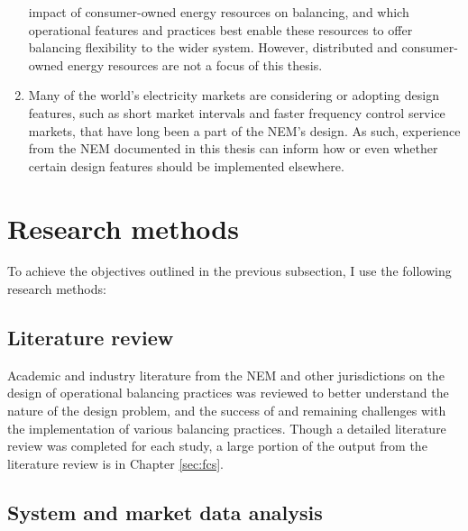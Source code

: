 \documentclass[12pt,a4paper,]{report}
\begin{document}
\begin{enumerate}
  impact of consumer-owned energy resources on balancing, and which
  operational features and practices best enable these resources to
  offer balancing flexibility to the wider system. However, distributed
  and consumer-owned energy resources are not a focus of this thesis.
\item
  Many of the world's electricity markets are considering or adopting
  design features, such as short market intervals and faster frequency
  control service markets, that have long been a part of the NEM's
  design. As such, experience from the NEM documented in this thesis can
  inform how or even whether certain design features should be
  implemented elsewhere.
\end{enumerate}

\hypertarget{research-methods}{%
\section{Research methods}\label{research-methods}}

To achieve the objectives outlined in the previous subsection, I use the
following research methods:

\hypertarget{literature-review}{%
\subsection{Literature review}\label{literature-review}}

Academic and industry literature from the NEM and other jurisdictions on
the design of operational balancing practices was reviewed to better
understand the nature of the design problem, and the success of and
remaining challenges with the implementation of various balancing
practices. Though a detailed literature review was completed for each
study, a large portion of the output from the literature review is in
Chapter \ref{sec:fcs}.

\hypertarget{system-and-market-data-analysis}{%
\subsection{System and market data
analysis}\label{system-and-market-data-analysis}}
\end{document}
